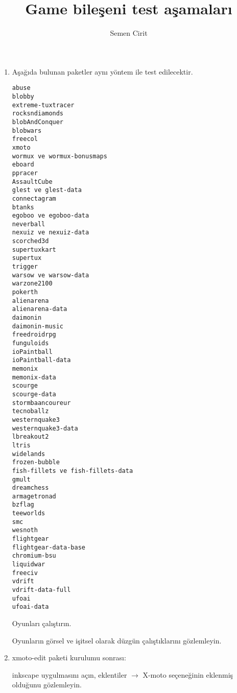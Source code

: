 \documentclass[a4paper,10pt]{article}
\title{Game bileşeni test aşamaları}
\author{Semen Cirit}
\begin{document}
\maketitle

\begin{enumerate}
\item Aşağıda bulunan paketler aynı yöntem ile test edilecektir.
\begin{verbatim}
abuse
blobby
extreme-tuxtracer
rocksndiamonds 
blobAndConquer
blobwars
freecol
xmoto
wormux ve wormux-bonusmaps
eboard
ppracer
AssaultCube
glest ve glest-data
connectagram
btanks
egoboo ve egoboo-data
neverball
nexuiz ve nexuiz-data
scorched3d
supertuxkart
supertux
trigger
warsow ve warsow-data
warzone2100
pokerth
alienarena
alienarena-data
daimonin
daimonin-music
freedroidrpg
funguloids
ioPaintball
ioPaintball-data
memonix
memonix-data
scourge
scourge-data
stormbaancoureur
tecnoballz
westernquake3
westernquake3-data
lbreakout2
ltris
widelands
frozen-bubble
fish-fillets ve fish-fillets-data
gmult
dreamchess
armagetronad
bzflag
teeworlds
smc
wesnoth
flightgear
flightgear-data-base
chromium-bsu
liquidwar
freeciv
vdrift
vdrift-data-full
ufoai
ufoai-data
\end{verbatim}

Oyunları çalıştırın.

Oyunların görsel ve işitsel olarak düzgün çalıştıklarını gözlemleyin.

\item xmoto-edit paketi kurulumu sonrası:

inkscape uygulmasını açın, eklentiler $\rightarrow$ X-moto seçeneğinin eklenmiş olduğunu gözlemleyin.
\end{enumerate}
\end{document}
